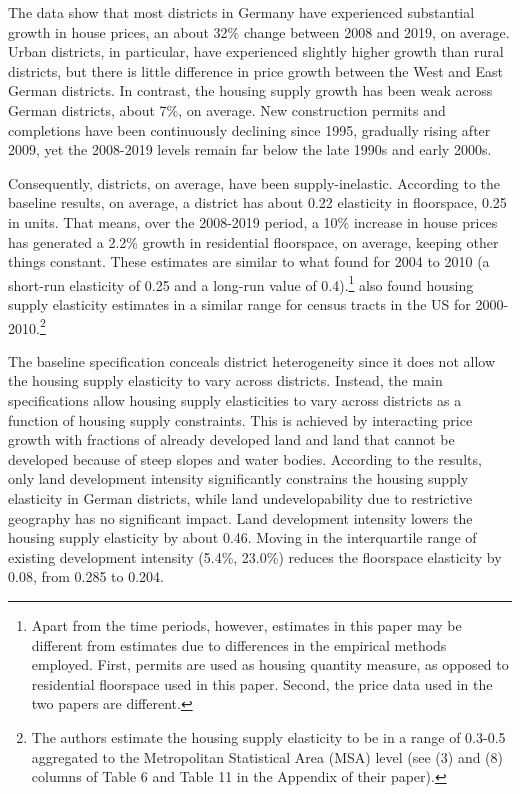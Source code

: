 \documentclass[
  12pt,
]{article}
\begin{document}
The data show that most districts in Germany have experienced substantial growth in house prices, an about 32\% change between 2008 and 2019, on average. Urban districts, in particular, have experienced slightly higher growth than rural districts, but there is little difference in price growth between the West and East German districts. In contrast, the housing supply growth has been weak across German districts, about 7\%, on average. New construction permits and completions have been continuously declining since 1995, gradually rising after 2009, yet the 2008-2019 levels remain far below the late 1990s and early 2000s.

Consequently, districts, on average, have been supply-inelastic. According to the baseline results, on average, a district has about 0.22 elasticity in floorspace, 0.25 in units. That means, over the 2008-2019 period, a 10\% increase in house prices has generated a 2.2\% growth in residential floorspace, on average, keeping other things constant. These estimates are similar to what \citet{lerbs2014} found for 2004 to 2010 (a short-run elasticity of 0.25 and a long-run value of 0.4).\footnote{Apart from the time periods, however, estimates in this paper may be different from \citet{lerbs2014} estimates due to differences in the empirical methods employed. First, permits are used as housing quantity measure, as opposed to residential floorspace used in this paper. Second, the price data used in the two papers are different.} \citet{baumsnow-han2019} also found housing supply elasticity estimates in a similar range for census tracts in the US for 2000-2010.\footnote{The authors estimate the housing supply elasticity to be in a range of 0.3-0.5 aggregated to the Metropolitan Statistical Area (MSA) level (see (3) and (8) columns of Table 6 and Table 11 in the Appendix of their paper).}

The baseline specification conceals district heterogeneity since it does not allow the housing supply elasticity to vary across districts. Instead, the main specifications allow housing supply elasticities to vary across districts as a function of housing supply constraints. This is achieved by interacting price growth with fractions of already developed land and land that cannot be developed because of steep slopes and water bodies. According to the results, only land development intensity significantly constrains the housing supply elasticity in German districts, while land undevelopability due to restrictive geography has no significant impact. Land development intensity lowers the housing supply elasticity by about 0.46. Moving in the interquartile range of existing development intensity (5.4\%, 23.0\%) reduces the floorspace elasticity by 0.08, from 0.285 to 0.204.
\end{document}
